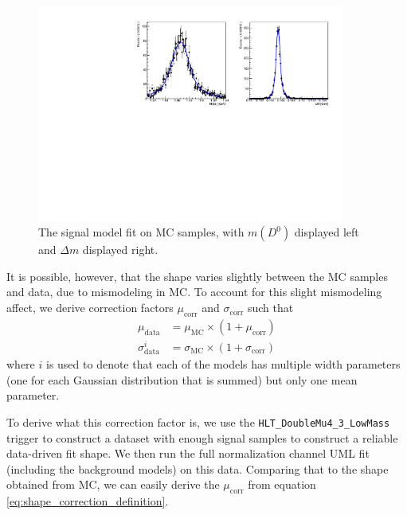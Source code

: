 \begin{figure}[htp]
    \begin{center}
      \includegraphics[width=0.9\textwidth]{figures/chapter4/normalization_fit/dpipi_fit_mc.pdf}
    \end{center}
    \caption{
      The signal model fit on MC samples, with $m(D^0)$ displayed left and $\Delta m$ displayed right.
    }
    \label{fig:d0pipi_uml_fit_pipi_model}
\end{figure}

It is possible, however, that the shape varies slightly between the MC samples and data, due to mismodeling in MC. To account for this slight mismodeling affect, we derive correction factors $\mu_{\text{corr}}$ and $\sigma_{\text{corr}}$ such that
\begin{equation}
\begin{split}
    \mu_{\text{data}} &= \mu_{\text{MC}} \times (1+\mu_{\text{corr}}) \\
    \sigma^i_{\text{data}} &= \sigma_{\text{MC}} \times (1+\sigma_{\text{corr}}) 
\end{split}
\label{eq:shape_correction_definition}
\end{equation}
where $i$ is used to denote that each of the models has multiple width parameters (one for each Gaussian distribution that is summed) but only one mean parameter.

To derive what this correction factor is, we use the \texttt{HLT\_DoubleMu4\_3\_LowMass} trigger to construct a dataset with enough signal samples to construct a reliable data-driven fit shape. We then run the full normalization channel UML fit (including the background models) on this data. Comparing that to the shape obtained from MC, we can easily derive the $\mu_{\text{corr}}$ from equation \ref{eq:shape_correction_definition}. 

